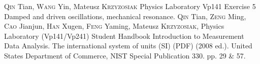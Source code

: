\begin{thebibliography}{99}
     \textsc{Qin} Tian, \textsc{Wang} Yin, Mateusz \textsc{Krzyzosiak} Physics Laboratory Vp141 Exercise 5 Damped and driven oscillations, mechanical resonance.
     \textsc{Qin} Tian, \textsc{Zeng} Ming, \textsc{Cao} Jianjun, \textsc{Han} Xugen, \textsc{Feng} Yaming, Mateusz \textsc{Krzyzosiak}, Physics Laboratory (Vp141/Vp241) Student Handbook Introduction to Measurement Data Analysis.
     The international system of units (SI) (PDF) (2008 ed.). United States Department of Commerce, NIST Special Publication 330. pp. 29 \& 57.
\end{thebibliography}